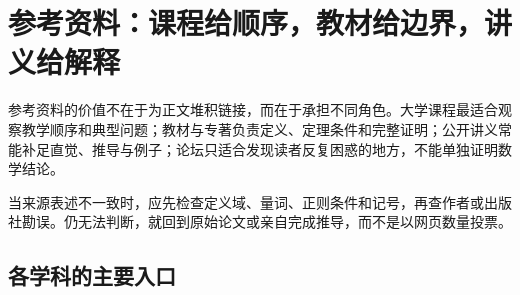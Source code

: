 \section{参考资料：课程给顺序，教材给边界，讲义给解释}

参考资料的价值不在于为正文堆积链接，而在于承担不同角色。大学课程最适合观察教学顺序和典型问题；教材与专著负责定义、定理条件和完整证明；公开讲义常能补足直觉、推导与例子；论坛只适合发现读者反复困惑的地方，不能单独证明数学结论。

当来源表述不一致时，应先检查定义域、量词、正则条件和记号，再查作者或出版社勘误。仍无法判断，就回到原始论文或亲自完成推导，而不是以网页数量投票。

\subsection{各学科的主要入口}

